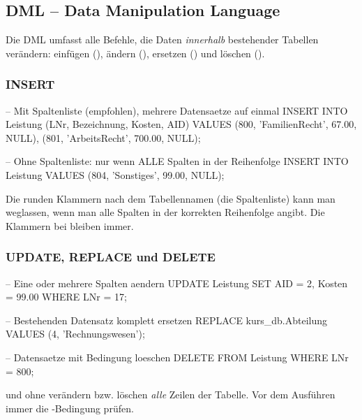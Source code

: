 \subsection{DML -- Data Manipulation Language}
Die DML umfasst alle Befehle, die Daten \emph{innerhalb} bestehender Tabellen verändern: einfügen (), ändern (), ersetzen () und löschen ().

\subsubsection{INSERT}
\begin{syntaxbox}[SQL]
-- Mit Spaltenliste (empfohlen), mehrere Datensaetze auf einmal
INSERT INTO Leistung (LNr, Bezeichnung, Kosten, AID) VALUES
    (800, 'FamilienRecht',  67.00, NULL),
    (801, 'ArbeitsRecht',  700.00, NULL);

-- Ohne Spaltenliste: nur wenn ALLE Spalten in der Reihenfolge
INSERT INTO Leistung VALUES (804, 'Sonstiges', 99.00, NULL);
\end{syntaxbox}

\begin{infobox}
Die runden Klammern nach dem Tabellennamen (die Spaltenliste) kann man weglassen, wenn man alle Spalten in der korrekten Reihenfolge angibt. Die Klammern bei  bleiben immer.
\end{infobox}

\subsubsection{UPDATE, REPLACE und DELETE}
\begin{syntaxbox}[SQL]
-- Eine oder mehrere Spalten aendern
UPDATE Leistung
SET AID = 2, Kosten = 99.00
WHERE LNr = 17;

-- Bestehenden Datensatz komplett ersetzen
REPLACE kurs_db.Abteilung VALUES (4, 'Rechnungswesen');

-- Datensaetze mit Bedingung loeschen
DELETE FROM Leistung
WHERE LNr = 800;
\end{syntaxbox}

\begin{warnbox}[Achtung]
 und  ohne  verändern bzw. löschen \emph{alle} Zeilen der Tabelle. Vor dem Ausführen immer die -Bedingung prüfen.
\end{warnbox}
